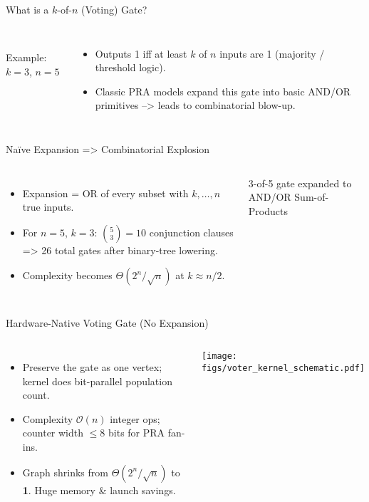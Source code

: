 \begin{frame}[t]{What is a $k$-of-$n$ (Voting) Gate?}
  \begin{columns}
      \centering
    
      \\[-4pt] \scriptsize Example: $k=3$, $n=5$
      \begin{itemize}[<+->]
        \item Outputs 1 iff at least $k$ of $n$ inputs are 1 (majority / threshold logic).
        \item Classic PRA models expand this gate into basic AND/OR primitives --> leads to combinatorial blow-up.
      \end{itemize}
  \end{columns}
\end{frame}

\begin{frame}[t]{Naïve Expansion => Combinatorial Explosion}
  \begin{columns}
      \begin{itemize}[<+->]
        \item Expansion = OR of every subset with $k,\dots,n$ true inputs.
        \item For $n=5$, $k=3$: $\binom{5}{3}=10$ conjunction clauses => 26 total gates after binary-tree lowering.
        \item Complexity becomes $\Theta(2^{n}/\sqrt{n})$ at $k\approx n/2$.
      \end{itemize}
      \centering
      
      \scriptsize 3-of-5 gate expanded to AND/OR Sum-of-Products
  \end{columns}
\end{frame}

\begin{frame}[t]{Hardware-Native Voting Gate (No Expansion)}
  \begin{columns}
      \begin{itemize}[<+->]
        \item Preserve the gate as one vertex; kernel does bit-parallel population count.
        \item Complexity $\mathcal{O}(n)$ integer ops; counter width $\le 8$ bits for PRA fan-ins.
        \item Graph shrinks from $\Theta(2^{n}/\sqrt{n})$ to \textbf{1}. Huge memory & launch savings.
      \end{itemize}
      \centering
      \texttt{[image: figs/voter\_kernel\_schematic.pdf]} %
  \end{columns}
\end{frame}